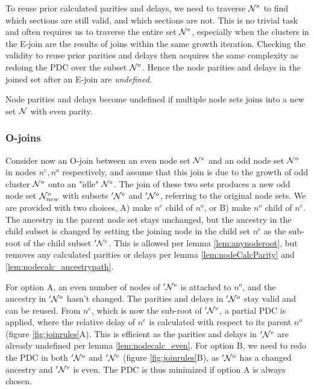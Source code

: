 To reuse prior calculated parities and delays, we need to traverse $\mathcal{N}^e$ to find which sections are still valid, and which sections are not. This is no trivial task and often requires us to traverse the entire set $\mathcal{N}^e$, especially when the clusters in the E-join are the results of joins within the same growth iteration.  Checking the validity to reuse prior parities and delays then acquires the same complexity as redoing the PDC over the subset $\mathcal{N}^e$. Hence the node parities and delays in the joined set after an E-join are \emph{undefined}.

\begin{lemma}\label{lem:nodecalc_even}
  Node parities and delays become undefined if multiple node sets joins into a new set $\mathcal{N}$ with even parity.
\end{lemma}

\subsubsection{O-joins}

Consider now an O-join between an even node set $\mathcal{N}^e$ and an odd node set $\mathcal{N}^o$ in nodes $n^e, n^o$ respectively, and assume that this join is due to the growth of odd cluster $\mathcal{N}^o$ onto an "idle" $\mathcal{N}^e$. The join of these two sets produces a new odd node set $\mathcal{N}_{new}^o$ with subsets $'\mathcal{N}^e$ and $'\mathcal{N}^o$, referring to the original node sets. We are provided with two choices, A) make $n^e$ child of $n^o$, or B) make $n^o$ child of $n^e$. The ancestry in the parent node set stays unchanged, but the ancestry in the child subset is changed by setting the joining node in the child set $n^c$ as the sub-root of the child subset $'\mathcal{N}^c$. This is allowed per lemma \ref{lem:anynoderoot}, but removes any calculated parities or delays per lemma \ref{lem:nodeCalcParity} and \ref{lem:nodecalc_ancestrypath}.

For option A, an even number of nodes of $'\mathcal{N}^e$ is attached to $n^o$, and the ancestry in $'\mathcal{N}^o$ hasn't changed. The parities and delays in $'\mathcal{N}^o$ stay valid and can be reused. From $n^e$, which is now the sub-root of  $'\mathcal{N}^e$, a partial PDC is applied, where the relative delay of $n^e$ is calculated with respect to its parent $n^o$ (figure \ref{fig:joinrules}A). This is efficient as the parities and delays in $'\mathcal{N}^e$ are already undefined per lemma \ref{lem:nodecalc_even}. For option B, we need to redo the PDC in both $'\mathcal{N}^o$ and $'\mathcal{N}^e$ (figure \ref{fig:joinrules}B), as $'\mathcal{N}^o$ has a changed ancestry and  $'\mathcal{N}^e$ is even. The PDC is thus minimized if option A is always chosen. \\

